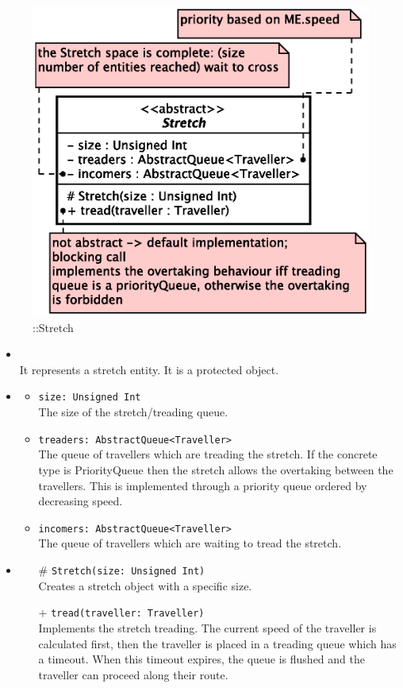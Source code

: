 \begin{figure}[h]
\centering
\includegraphics[scale=0.6,keepaspectratio]{images/solution/app/backend/stretch.eps}
\caption{\pReactiveComponentStretch::Stretch}
\label{fig:sd-app-stretch}
\end{figure}
\FloatBarrier
\begin{itemize}
  \item \textbf{\descr} \\
    It represents a stretch entity. It is a protected object.
  \item \textbf{\attrs}
  \begin{itemize}
    \item \texttt{size: Unsigned Int} \\
The size of the stretch/treading queue.
    \item \texttt{treaders: AbstractQueue<Traveller>} \\
The queue of travellers which are treading the stretch. If the concrete type
is PriorityQueue then the stretch allows the overtaking between the travellers.
This is implemented through a priority queue ordered by decreasing speed.
    \item \texttt{incomers: AbstractQueue<Traveller>} \\
The queue of travellers which are waiting to tread the stretch. 
  \end{itemize}
  \item \textbf{\ops}
  \begin{itemize}
    \item[\#] \texttt{Stretch(size: Unsigned Int)} \\
Creates a stretch object with a specific size.
    \item[+] \texttt{tread(traveller: Traveller)} \\
Implements the stretch treading. The current speed of the traveller
is calculated first, then the traveller is placed in a treading queue which has a  
timeout. When this timeout expires, the queue is flushed and the traveller can
proceed along their route.
  \end{itemize}
\end{itemize}
